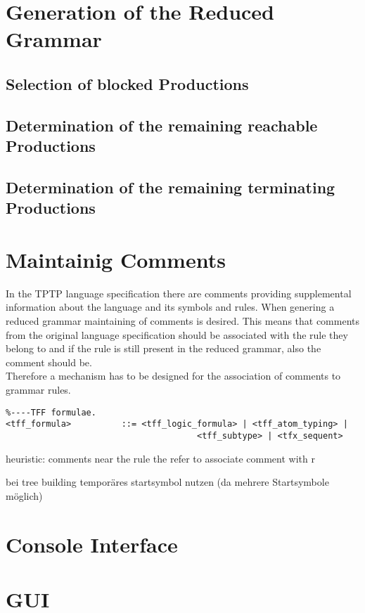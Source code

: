 \section{Generation of the Reduced Grammar}\label{sec:ConceptGenerateReducedGrammar}

\subsection{Selection of blocked Productions}

\subsection{Determination of the remaining reachable Productions}

\subsection{Determination of  the remaining terminating Productions}

\section{Maintainig Comments}\label{sec:ConceptMaintaining Comments}
In the \ac{TPTP} language specification there are comments providing supplemental information about the language and its symbols and rules.
When genering a  reduced grammar maintaining of comments is desired. This means that comments from the original language specification should be associated with the rule they belong to and if the rule is still present in the reduced grammar, also the comment should be.\\
Therefore a mechanism has to be designed for the association of comments to grammar rules.

\begin{lstlisting}[basicstyle=\scriptsize	,caption= Example of a comment in the \ac{TPTP} language specification,label= lst:ConceptComment_tptp]
%----Top of Page---------------------------------------------------------------
%----TFF formulae.
<tff_formula>          ::= <tff_logic_formula> | <tff_atom_typing> |
                           			  <tff_subtype> | <tfx_sequent>
\end{lstlisting}
heuristic:
comments near the rule the refer to
associate comment with r

bei tree building temporäres startsymbol nutzen (da mehrere Startsymbole möglich)

\section{Console Interface}\label{sec:Console Interface}

\section{GUI}\label{sec:ConceptGUI}


